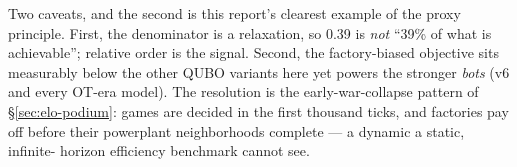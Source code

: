 Two caveats, and the second is this report's clearest example of the proxy
principle. First, the denominator is a relaxation, so 0.39 is \emph{not}
``39\% of what is achievable''; relative order is the signal. Second, the
factory-biased objective sits measurably below the other QUBO variants here
yet powers the stronger \emph{bots} (v6 and every OT-era model). The
resolution is the early-war-collapse pattern of \S\ref{sec:elo-podium}:
games are decided in the first thousand ticks, and factories pay off before
their powerplant neighborhoods complete --- a dynamic a static, infinite-
horizon efficiency benchmark cannot see.
